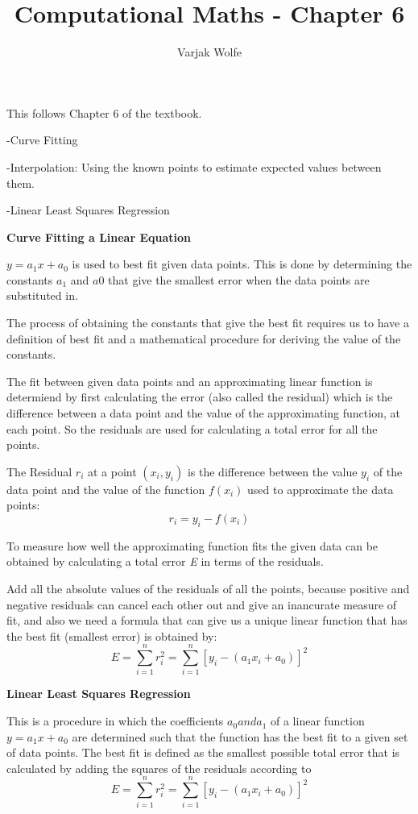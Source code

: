 \documentclass{article}
\title{Computational Maths - Chapter 6}
\author{Varjak Wolfe}
\begin{document}
\maketitle

This follows Chapter 6 of the textbook.

-Curve Fitting

-Interpolation: Using the known points to estimate expected values between them.

-Linear Least Squares Regression

\textbf{Curve Fitting a Linear Equation}

$ y = a_1x + a_0$ is used to best fit given data points. This is done by determining the constants $a_1$ and $a0$ that give the smallest error when the data points are substituted in.

The process of obtaining the constants that give the best fit requires us to have a definition of best fit and a mathematical procedure for deriving the value of the constants.

The fit between given data points and an approximating linear function is determiend by first calculating the error (also called the residual) which is the difference between a data point and the value of the approximating function, at each point. So the residuals are used for calculating a total error for all the points.

The Residual $r_i$ at a point $(x_i, y_i)$ is the difference between the value $y_i$ of the data point and the value of the function $f(x_i)$ used to approximate the data points:
\[ r_i = y_i - f(x_i)\]

To measure how well the approximating function fits the given data can be obtained by calculating a total error \textit{E} in terms of the residuals. 

Add all the absolute values of the residuals of all the points, because positive and negative residuals can cancel each other out and give an inancurate measure of fit, and also we need a formula that can give us a unique linear function that has the best fit (smallest error) is obtained by:
\[ E = \sum^{n}_{i=1}r_i^2 = \sum^{n}_{i=1} [y_i - (a_1x_i + a_0)]^2 \]

\textbf{Linear Least Squares Regression}

This is a procedure in which the coefficients $a_0 and a_1$ of a linear function $y = a_1x + a_0$ are determined such that the function has the best fit to a given set of data points. The best fit is defined as the smallest possible total error that is calculated by adding the squares of the residuals according to \[ E = \sum^{n}_{i=1}r_i^2 = \sum^{n}_{i=1} [y_i - (a_1x_i + a_0)]^2 \]
\end{document}
